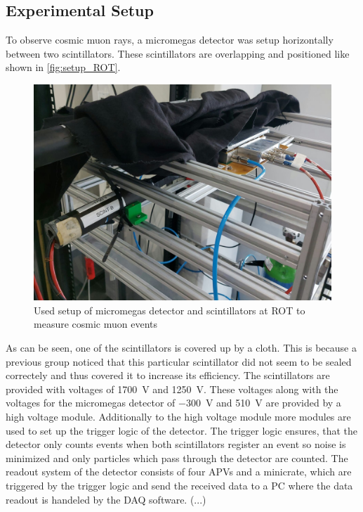 \documentclass[sn-mathphys-num,iicol]{sn-jnl}
\theoremstyle{thmstyleone}
\theoremstyle{thmstyletwo}
\theoremstyle{thmstylethree}
\begin{document}
\subsection{Experimental Setup}
To observe cosmic muon rays, a micromegas detector was setup horizontally between two scintillators. 
These scintillators are overlapping and positioned like shown in \autoref{fig:setup_ROT}.

\begin{figure}
  \includegraphics[width=\linewidth]{figures/setup_ROT.jpeg}
  \caption{Used setup of micromegas detector and scintillators at ROT to measure cosmic muon events}
  \label{fig:setup_ROT}
\end{figure}

As can be seen, one of the scintillators is covered up by a cloth. This is because a previous group noticed that this particular scintillator did not seem to be sealed correctely and thus covered it to increase its efficiency.
The scintillators are provided with voltages of \SI{1700}{\volt} and \SI{1250}{\volt}. These voltages along with the voltages for the micromegas detector of \SI{-300}{\volt} and \SI{510}{\volt} are provided by a high voltage module.
Additionally to the high voltage module more modules are used to set up the trigger logic of the detector.
The trigger logic ensures, that the detector only counts events when both scintillators register an event so noise is minimized and only particles which pass through the detector are counted.
The readout system of the detector consists of four APVs and a minicrate, which are triggered by the trigger logic and send the received data to a PC where the data readout is handeled by the DAQ software.
(...) %
\end{document}
